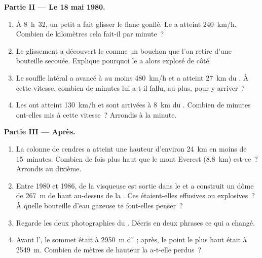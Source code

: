 \begin{problem}
\medskip
\noindent\textbf{Partie II --- Le 18 mai 1980.}\par\nopagebreak
\begin{enumerate}[resume, beginpenalty=10000]
  \item À 8~h~32, un petit  a fait glisser le flanc gonflé. Le
         a atteint \qty{240}{km/h}. Combien de
        kilomètres cela fait-il par minute~?
  \item Le glissement a découvert le  comme un bouchon que l'on retire
        d'une bouteille secouée. Explique pourquoi le  a alors
        explosé de côté.
  \item Le souffle latéral a avancé à au moins \qty{480}{km/h} et a
        atteint \qty{27}{km} du . À cette vitesse, combien de minutes
        lui a-t-il fallu, au plus, pour y arriver~?
  \item Les  ont atteint \qty{130}{km/h} et sont
        arrivées à \qty{8}{km} du . Combien de minutes ont-elles mis
        à cette vitesse~? Arrondis à la minute.
\end{enumerate}

\medskip
\noindent\textbf{Partie III --- Après.}\par\nopagebreak
\begin{enumerate}[resume, beginpenalty=10000]
  \item La colonne de cendres a atteint une hauteur d'environ \qty{24}{km}
        en moins de 15~minutes. Combien de fois plus haut que le mont
        Everest (\qty{8.8}{km}) est-ce~? Arrondis au dixième.
  \item Entre 1980 et 1986, de la  visqueuse est sortie dans le 
        et a construit un dôme de \qty{267}{m} de haut au-dessus de la
        . Ces  étaient-elles effusives ou explosives~? À
        quelle bouteille d'eau gazeuse te font-elles penser~?
  \item Regarde les deux photographies du . Décris en deux phrases ce
        qui a changé.
  \item Avant l', le sommet était à \qty{2950}{m} d'~;
        après, le point le plus haut était à \qty{2549}{m}. Combien de
        mètres de hauteur la  a-t-elle perdus~?
\end{enumerate}
\end{problem}
